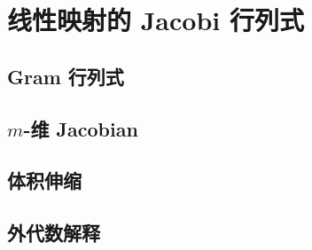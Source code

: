 \section{线性映射的 Jacobi 行列式}
\label{b1:sec:1701}


\subsection{Gram 行列式}
\label{b1:subsec:170101}

\subsection{\texorpdfstring{\(m\)}{m}-维 Jacobian}
\label{b1:subsec:170102}

\subsection{体积伸缩}
\label{b1:subsec:170103}

\subsection{外代数解释}
\label{b1:subsec:170104}


